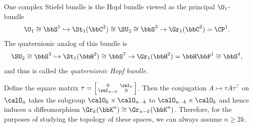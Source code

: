 \begin{example}\label{ex Hopf principal bundle}
    One complex Stiefel bundle is the Hopf bundle viewed as the principal $\U_1$-bundle
    \[\U_1\cong\bbS^1\hookrightarrow \St_1(\bbC^2)\cong \SU_2\cong\bbS^3\to \Gr_1(\bbC^2)=\CP^1.\]
    The quaternionic analog of this bundle is 
    \[\SU_2\cong \bbS^3\hookrightarrow \St_1(\bbH^2)\cong \bbS^7\to \Gr_1(\bbH^2)=\bbH\bbP^1\cong \bbS^4,\]
    and thus is called the \emph{quaternionic Hopf bundle}.
\end{example}

\begin{rem}
   Define the square matrix $\tau=\left[\begin{smallmatrix}
       0&\rmI_k\\\rmI_{n-k}&0
   \end{smallmatrix}\right]$. 
   Then the conjugation $A\mapsto \tau A\tau^\top $ on $\calO_n$ takes the subgroup $\calO_k\times\calO_{n-k}$ to $\calO_{n-k}\times\calO_{k}$ and hence induces a diffeomorphism $\Gr_k(\bbK^n)\cong \Gr_{n-k}(\bbK^n)$. Therefore, for the purposes of studying the topology of these spaces, we can always assume $n\geq 2k$.
\end{rem}


